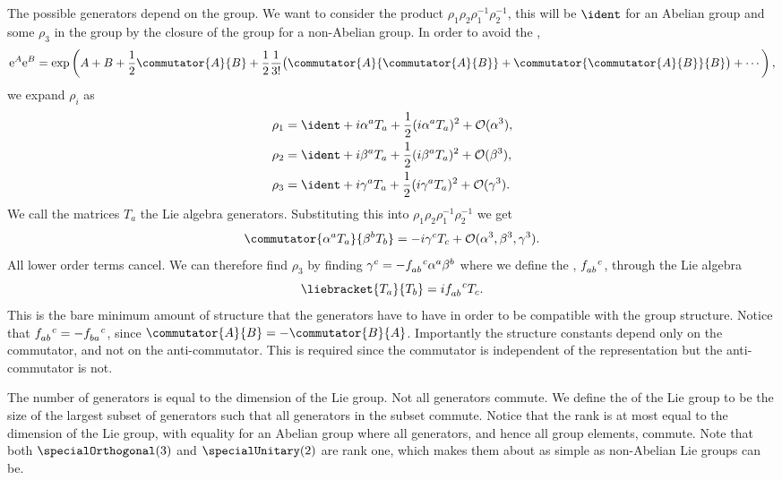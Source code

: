 The possible generators depend on the group.
We want to consider the product \(\rho_1\rho_2\rho_1^{-1}\rho_2^{-1}\), this will be \(\ident\) for an Abelian group and some \(\rho_3\) in the group by the closure of the group for a non-Abelian group.
In order to avoid the ,
\begin{equation}
    \e^{A}\e^{B} = \exp\left( A + B + \frac{1}{2}\commutator{A}{B} + \frac{1}{2}\frac{1}{3!}\big(\commutator{A}{\commutator{A}{B}} + \commutator{\commutator{A}{B}}{B}\big) + \dotsb \right),
\end{equation}
we expand \(\rho_i\) as
\begin{align}
    \rho_1 &= \ident + i\alpha^a T_a + \frac{1}{2}(i\alpha^aT_a)^2 + \order(\alpha^3),\\
    \rho_2 &= \ident + i\beta^a T_a + \frac{1}{2}(i\beta^aT_a)^2 + \order(\beta^3),\\
    \rho_3 &= \ident + i\gamma^a T_a + \frac{1}{2}(i\gamma^aT_a)^2 + \order(\gamma^3).
\end{align}
We call the matrices \(T_a\) the Lie algebra generators.
Substituting this into \(\rho_1\rho_2\rho_1^{-1}\rho_2^{-1}\) we get
\begin{equation}
    \commutator{\alpha^aT_a}{\beta^bT_b} = -i\gamma^cT_c + \order(\alpha^3, \beta^3, \gamma^3).
\end{equation}
All lower order terms cancel.
We can therefore find \(\rho_3\) by finding \(\gamma^c = -\tensor{f}{_{ab}^c}\alpha^a\beta^b\) where we define the , \(\tensor{f}{_{ab}^c}\), through the Lie algebra
\begin{equation}
    \liebracket{T_a}{T_b} = i\tensor{f}{_{ab}^c} T_c.
\end{equation}
This is the bare minimum amount of structure that the generators have to have in order to be compatible with the group structure.
Notice that \(\tensor{f}{_{ab}^c} = -\tensor{f}{_{ba}^c}\), since \(\commutator{A}{B} = -\commutator{B}{A}\).
Importantly the structure constants depend only on the commutator, and not on the anti-commutator.
This is required since the commutator is independent of the representation but the anti-commutator is not.

The number of generators is equal to the dimension of the Lie group.
Not all generators commute.
We define the  of the Lie group to be the size of the largest subset of generators such that all generators in the subset commute.
Notice that the rank is at most equal to the dimension of the Lie group, with equality for an Abelian group where all generators, and hence all group elements, commute.
Note that both \(\specialOrthogonal(3)\) and \(\specialUnitary(2)\) are rank one, which makes them about as simple as non-Abelian Lie groups can be.

